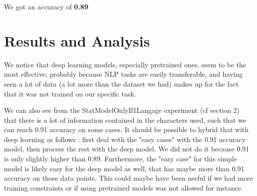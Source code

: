 \documentclass[11pt]{article}
\begin{document}
We got an accuracy of \textbf{0.89}

\section{Results and Analysis}

We notice that deep learning models, especially pretrained ones, seem to be the most effective, probably because NLP tasks are easily transferable, and having seen a lot of data (a lot more than the dataset we had) makes up for the fact that it was not trained on our specific task.

We can also see from the StatModelOnlyIf1Langage experiment (cf section 2) that there is a lot of information contained in the characters used, such that we can reach 0.91 accuracy on some cases. It should be possible to hybrid that with deep learning as follows : first deal with the "easy cases" with the 0.91 accuracy model, then process the rest with the deep model. We did not do it because 0.91  is only slightly higher than 0.89. Furthermore, the "easy case" for this simple model is likely easy for the deep model as well, that has maybe more than 0.91 accuracy on those data points.
This could maybe have been useful if we had more training constraints or if using pretrained models was not allowed for instance.




\end{document}
